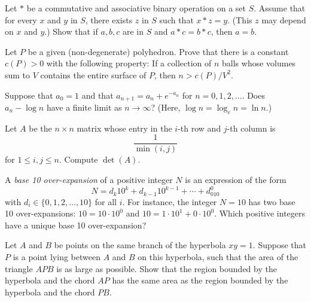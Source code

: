 \documentclass[12pt]{article}
\begin{document}
    \begin{exercise}[2012 A2]
        Let $*$ be a commutative and associative binary operation on a set $S$. Assume that for every $x$ and $y$ in $S$, there exists $z$ in $S$ such that $x*z=y$. (This $z$ may depend on $x$ and $y$.) Show that if $a,b,c$ are in $S$ and $a*c=b*c$, then $a = b$.
    \end{exercise}

    \begin{exercise}[2012 B2]
        Let $P$ be a given (non-degenerate) polyhedron. Prove that there is a constant $c(P ) > 0$ with the following property: If a collection of $n$ balls whose volumes sum to $V$ contains the entire surface of $P$, then $n > c(P)/V^2$.
    \end{exercise}

    \begin{exercise}[2012 B4]
        Suppose that \(a_0=1\) and that \(a_{n+1}=a_n+e^{-a_n}\) for \(n=0,1,2,\ldots\). Does \(a_n-\log n\) have a finite limit as \(n\to\infty\)? (Here, \(\log n=\log_en=\ln n\).)
    \end{exercise}

    \begin{exercise}[2014 A2]
        Let $A$ be the $n \times n$ matrix whose entry in the $i$-th row and $j$-th column is
        \[\frac{1}{\min(i, j)}
        \]
        for $1 \leq i, j \leq n$. Compute $\det(A)$.
    \end{exercise}

    \begin{exercise}[2014 B1]
        A {\it base 10 over-expansion} of a positive integer \(N\) is an expression of the form
        \[N = d_k10^k+d_{k-1}10^{k-1}+\cdots+d_010^0\]
        with \(d_i\in\{0,1,2,\ldots,10\}\) for all \(i\).
        For instance, the integer \(N=10\) has two base 10 over-expansions: \(10=10\cdot 10^0\) and \(10=1\cdot 10^1+0\cdot 10^0\).
        Which positive integers have a unique base 10 over-expansion?
    \end{exercise}

    \begin{exercise}[2015 A1]
        Let $A$ and $B$ be points on the same branch of the hyperbola $xy = 1$. Suppose that $P$ is a point lying between $A$ and $B$ on this hyperbola, such that the area of the triangle $APB$ is as large as possible. Show that the region bounded by the hyperbola and the chord $AP$ has the same area as the region bounded by the hyperbola and the chord $PB$.
    \end{exercise}
\end{document}
